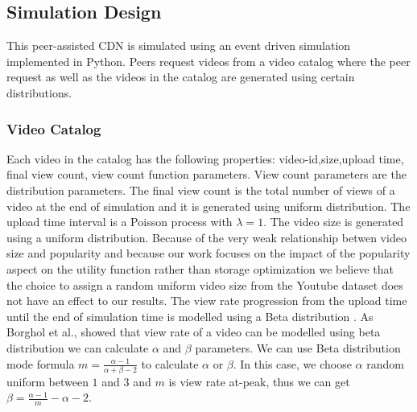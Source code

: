 \documentclass[10pt,final,journal,a4paper]{IEEEtran}
\begin{document}
\subsection{Simulation Design}\label{simulationdesign}

This peer-assisted CDN is simulated using an event driven simulation implemented in Python. 
Peers request videos from a video catalog where the peer request as well as the videos in the catalog are generated using certain distributions.



\subsubsection{Video Catalog}\label{catalog}
Each video in the catalog has the following properties: 
video-id,size,upload time, final view count, view count function parameters. 
View count parameters are the distribution parameters.
The final view count is the total number of views of a video at the end of simulation and it is generated using uniform distribution.
The upload time interval is a Poisson process with $\lambda=1$.
The video size is generated using a uniform distribution.
Because of the very weak relationship betwen video size and popularity \cite{abhari2010workload} and because our work focuses on the impact of the popularity aspect on the utility function rather than storage optimization we believe that the choice to assign a random uniform video size from the Youtube dataset does not have an effect to our results. 
The view rate progression from the upload time until the end of simulation time is modelled using a Beta distribution \cite{Borghol:2011:CMP:2039452.2039717}.
As Borghol et al.,\cite{Borghol:2011:CMP:2039452.2039717} showed that view rate of a video can be modelled using beta distribution we can calculate $\alpha$ and $\beta$ parameters.
We can use Beta distribution mode formula $m=\frac{\alpha-1}{\alpha+\beta-2}$ to calculate $\alpha$ or $\beta$. 
In this case, we choose $\alpha$ random uniform between $1$ and $3$ and $m$ is view rate at-peak, thus we can get $\beta=\frac{\alpha-1}{m}-\alpha-2$.
\end{document}
